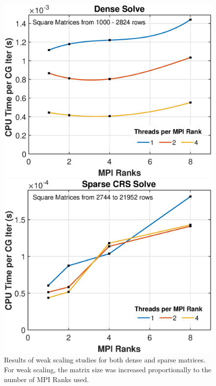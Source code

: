 \documentclass{article}
\begin{document}
\begin{figure}[H]
	\begin{minipage}[b]{0.5\linewidth}
		\centering
		\includegraphics[width=1.0\textwidth]{weak_scaling_dense_report.eps}  
	\end{minipage}
	\begin{minipage}[b]{0.5\linewidth}
		\centering
		\includegraphics[width=1.0\textwidth]{weak_scaling_sparse_report.eps}  
	\end{minipage}
	\caption{Results of weak scaling studies for both dense and sparse matrices. For weak scaling, the matrix size was increased proportionally to the number of MPI Ranks used.}
	\label{fig:Weak_scaling}
\end{figure}
\end{document}

